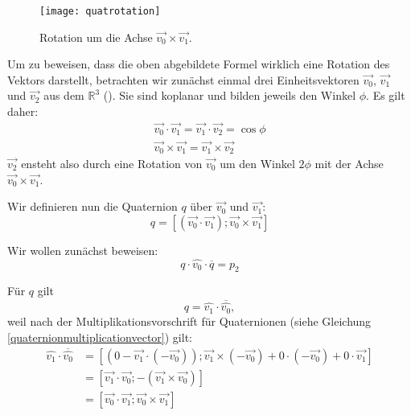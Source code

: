 \begin{wrapfigure}{r}{0.5\textwidth}
  \vspace{-10pt}
  \texttt{[image: quatrotation]}
  \vspace{-10pt}
  \caption{Rotation um die Achse $\vec{v_0} \times \vec{v_1}$.}
\end{wrapfigure}

Um zu beweisen, dass die oben abgebildete Formel wirklich eine Rotation des Vektors darstellt, betrachten wir zunächst einmal drei Einheitsvektoren $\vec{v_0}$, $\vec{v_1}$ und $\vec{v_2}$ aus dem $\mathbb R^3$ (\vgl \citep{quaternionproof}). Sie sind koplanar und bilden jeweils den Winkel $\phi$. Es gilt daher:
\begin{align}
 \vec{v_0} \cdot \vec{v_1} = \vec{v_1} \cdot \vec{v_2} = \cos \phi \label{dotsame} \\
 \vec{v_0} \times\vec{v_1} = \vec{v_1} \times \vec{v_2} \label{crosssame}
\end{align}
$\vec{v_2}$ ensteht also durch eine Rotation von $\vec{v_0}$ um den Winkel $2 \phi$ mit der Achse $\vec{v_0} \times \vec{v_1}$.

Wir definieren nun die Quaternion $q$ über $\vec{v_0}$ und $\vec{v_1}$:
\begin{equation}
 q = \left[ \left( \vec{v_0} \cdot \vec{v_1} \right); \vec{v_0} \times \vec{v_1} \right]
\end{equation} 

Wir wollen zunächst beweisen:
\begin{equation}
 \label{quaternionclaim}
 q \cdot \hat{v_0} \cdot \overline{q} = p_2
\end{equation} 

Für $q$ gilt
\begin{equation}
 \label{equality1}
 q = \hat{v_1} \cdot \overline{\hat{v_0}},
\end{equation}
weil nach der Multiplikationsvorschrift für Quaternionen (siehe Gleichung \ref{quaternionmultiplicationvector}) gilt:
\begin{equation}
\begin{split}
 \hat{v_1} \cdot \overline{\hat{v_0}} &= \left[ \left( 0 - \vec{v_1} \cdot (-\vec{v_0}) \right); \vec{v_1} \times (-\vec{v_0}) + 0 \cdot (-\vec{v_0}) + 0 \cdot \vec{v_1} \right] \\
 &= \left[ \vec{v_1} \cdot \vec{v_0}; -( \vec{v_1} \times \vec{v_0}) \right] \\
 &= \left[ \vec{v_0} \cdot \vec{v_1}; \vec{v_0} \times \vec{v_1} \right]
\end{split}
\end{equation} 

